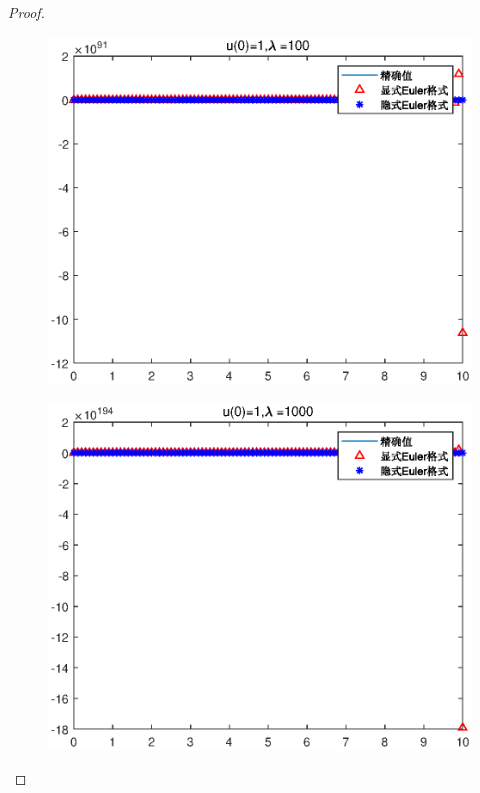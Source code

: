 \documentclass{article}%
\begin{document}
\begin{proof}
\begin{figure}
	\includegraphics[width=1\linewidth]{pic/week7_1_7.eps}
	\label{Fig:7}
	\caption{} 
\end{figure}
\begin{figure}
	\includegraphics[width=1\linewidth]{pic/week7_1_8.eps}
	\label{Fig:8}
	\caption{} 
\end{figure}
\begin{figure}

\end{figure}
\end{proof}
\end{document}

